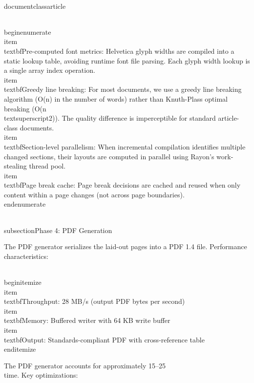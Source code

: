 \\documentclass{article}
\begin{document}
\\begin{enumerate}
  \\item \\textbf{Pre-computed font metrics}: Helvetica glyph widths are
    compiled into a static lookup table, avoiding runtime font file parsing.
    Each glyph width lookup is a single array index operation.
  \\item \\textbf{Greedy line breaking}: For most documents, we use a
    greedy line breaking algorithm (O(n) in the number of words) rather
    than Knuth-Plass optimal breaking (O(n\\textsuperscript{2})). The
    quality difference is imperceptible for standard article-class documents.
  \\item \\textbf{Section-level parallelism}: When incremental compilation
    identifies multiple changed sections, their layouts are computed in
    parallel using Rayon's work-stealing thread pool.
  \\item \\textbf{Page break cache}: Page break decisions are cached and
    reused when only content within a page changes (not across page
    boundaries).
\\end{enumerate}

\\subsection{Phase 4: PDF Generation}

The PDF generator serializes the laid-out pages into a PDF 1.4 file.
Performance characteristics:

\\begin{itemize}
  \\item \\textbf{Throughput}: 28 MB/s (output PDF bytes per second)
  \\item \\textbf{Memory}: Buffered writer with 64 KB write buffer
  \\item \\textbf{Output}: Standards-compliant PDF with cross-reference table
\\end{itemize}

The PDF generator accounts for approximately 15--25\\%
time. Key optimizations:
\end{document}
